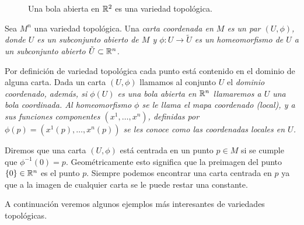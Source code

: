 \begin{figure}[h]
	\centering
	
	\caption{Una bola abierta en $\mathbb{R}^{2}$ es una variedad topológica.}
\end{figure}


\begin{definition}\label{Definición: Cartas Coordenadas}
	Sea $M^n$ una variedad topológica. Una \it{carta coordenada} en $M$ es un par $(U, \phi)$, donde $U$ es un subconjunto abierto de $M$ y $\phi: U \to \tilde{U}$ es un homeomorfismo de $U$ a un subconjunto abierto $\tilde{U} \subset \mathbb{R}^n$.
\end{definition}

Por definición de variedad topológica cada punto está contenido en el dominio de alguna carta. Dada un carta $(U,\phi)$ llamamos al conjunto $U$ el \it{dominio coordenado}, además, si $\phi(U)$ es una bola abierta en $\mathbb{R}^n$ llamaremos a $U$ una \it{bola coordinada}. Al homeomorfismo $\phi$ se le llama el \it{mapa coordenado (local)}, y a sus funciones componentes $(x^1,\hdots,x^n)$, definidas por $\phi(p) = (x^1(p), \hdots, x^n(p))$ se les conoce como las \it{coordenadas locales} en $U$.

Diremos que una carta $(U,\phi)$ está centrada en un punto $p \in M$ si se cumple que $\phi^{-1}(0) = p$. Geométricamente esto significa que la preimagen del punto $\{0\} \in \mathbb{R}^{n}$ es el punto $p$. Siempre podemos encontrar una carta centrada en $p$ ya que a la imagen de cualquier carta se le puede restar una constante.

A continuación veremos algunos ejemplos más interesantes de variedades topológicas.

